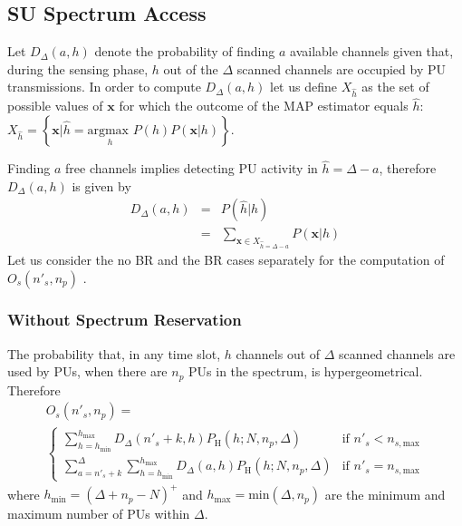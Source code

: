 \subsection{SU Spectrum Access}
Let $D_{\Delta}\left(a,h\right)$ denote the probability of finding $a$ available channels given that, during the sensing phase, $h$ out of the $\Delta$ scanned channels are occupied by PU transmissions. 
In order to compute $D_{\Delta}\left(a,h\right)$ let us define $X_{\hat{h}}$ as the set of possible values of $\mathbf{x}$ for which the outcome of the MAP estimator equals $\hat{h}$: $X_{\hat{h}} = \left\{\mathbf{x}|\hat{h} = \underset{h}{\text{argmax }} P\left(h\right)P\left(\mathbf{x}|h\right)\right\}$.

Finding $a$ free channels implies detecting PU activity in $\hat{h}=\Delta-a$, therefore
 $D_{\Delta}\left(a,h\right)$ is given by
\begin{equation}
\begin{array}{lcl}
D_{\Delta}\left(a,h\right) & = & P(\hat{h}|h)\\
& = & \sum_{\mathbf{x}\in X_{\hat{h}=\Delta-a}}P\left(\mathbf{x}|h\right)
\end{array}
\end{equation}  
Let us consider the no BR and the BR cases separately for the computation of $O_{s}\left(n'_{s},n_{p}\right)$ .
\subsubsection{Without Spectrum Reservation}
The probability that, in any time slot, $h$ channels out of $\Delta$ scanned channels are used by PUs, when there are $n_{p}$ PUs in the spectrum, is hypergeometrical. Therefore
\begin{equation}\label{Os1}
\begin{array}{l}
O_{s}\left(n'_{s},n_{p}\right) = \\
\begin{cases} \displaystyle\sum_{h=h_{\text{min}}}^{h_{\text{max}}}D_{\Delta}\left(n'_{s}+k,h\right)P_{\text{H}}\left(h;N,n_{p},\Delta\right)&\mbox{if } n'_{s}<n_{s,\text{max}}\\
\displaystyle\sum_{a=n'_{s}+k}^{\Delta}\displaystyle\sum_{h=h_{\text{min}}}^{h_{\text{max}}}D_{\Delta}\left(a,h\right)P_{\text{H}}\left(h;N,n_{p},\Delta\right)&\mbox{if } n'_{s}=n_{s,\text{max}}
\end{cases}
\end{array}
\end{equation} 
where $h_{\text{min}} = \left(\Delta+n_{p}-N\right)^{+}$ and $h_{\text{max}} = \mbox{min}\left(\Delta,n_{p}\right)$ are the minimum and maximum number of PUs within $\Delta$.
